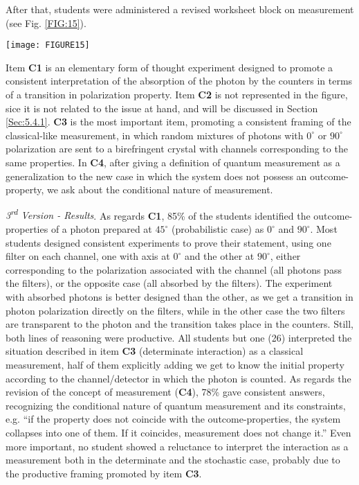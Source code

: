 \documentclass[twocolumn,secnumarabic,amssymb, nobibnotes, aps, prd, nofootinbib]{revtex4-2}
\begin{document}
After that, students were administered a revised worksheet block on measurement (see Fig. \ref{FIG:15}).
\begin{figure*}[!htpb]
       \texttt{[image: FIGURE15]}
    \caption{Worksheet block on quantum measurement: 2016 version.}
    \label{FIG:15}
\end{figure*}
Item \textbf{C1} is an elementary form of thought experiment designed to promote a consistent interpretation of the absorption of the photon by the counters in terms of a transition in polarization property. Item \textbf{C2} is not represented in the figure, sice it is not related to the issue at hand, and will be discussed in Section \ref{Sec:5.4.1}. \textbf{C3} is the most important item, promoting a consistent framing of the classical-like measurement, in which random mixtures of photons with $0^{\circ}$ or $90^{\circ}$ polarization are sent to a birefringent crystal with channels corresponding to the same properties. In \textbf{C4}, after giving a definition of quantum measurement as a generalization to the new case in which the system does not possess an outcome-property, we ask about the conditional nature of measurement.

\emph{3\textsuperscript{rd} Version - Results}. As regards \textbf{C1}, 85\% of the students identified the outcome-properties of a photon prepared at $45^{\circ}$ (probabilistic case) as $0^{\circ}$  and $90^{\circ}$. Most students designed consistent experiments to prove their statement, using one filter on each channel, one with axis at $0^{\circ}$ and the other at $90^{\circ}$, either corresponding to the polarization associated with the channel (all photons pass the filters), or the opposite case (all absorbed by the filters). The experiment with absorbed photons is better designed than the other, as we get a transition in photon polarization directly on the filters, while in the other case the two filters are transparent to the photon and the transition takes place in the counters. Still, both lines of reasoning were productive. All students but one (26) interpreted the situation described in item \textbf{C3} (determinate interaction) as a classical measurement, half of them explicitly adding we get to know the initial property according to the channel/detector in which the photon is counted. As regards the revision of the concept of measurement (\textbf{C4}), 78\% gave consistent answers, recognizing the conditional nature of quantum measurement and its constraints, e.g. ``if the property does not coincide with the outcome-properties, the system collapses into one of them. If it coincides, measurement does not change it.'' Even more important, no student showed a reluctance to interpret the interaction as a measurement both in the determinate and the stochastic case, probably due to the productive framing promoted by item \textbf{C3}.
\end{document}
